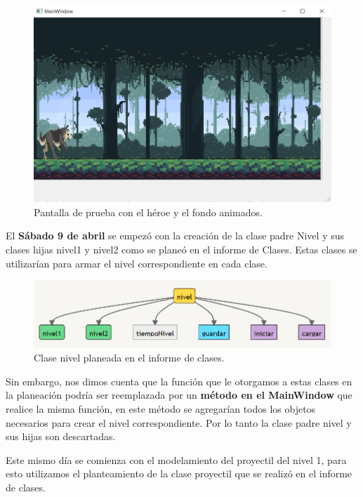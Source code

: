 \documentclass{article}
\begin{document}
\begin{figure}[h]
\includegraphics[scale=0.6]{Images/animaciones.png}
\centering
\caption{Pantalla de prueba con el héroe y el fondo animados.}
\label{fig:animacion}
\end{figure}

El \textbf{Sábado 9 de abril} se empezó con la creación de la clase padre Nivel y sus clases hijas nivel1 y nivel2 como se planeó en el informe de Clases. Estas clases se utilizarían para armar el nivel correspondiente en cada clase.

\newpage
\begin{figure}[h]
\includegraphics[scale=0.6]{Images/niveles.png}
\centering
\caption{Clase nivel planeada en el informe de clases.}
\label{fig:niveles}
\end{figure}

Sin embargo, nos dimos cuenta que la función que le otorgamos a estas clases en la planeación podría ser reemplazada por un \textbf{método en el MainWindow} que realice la misma función, en este método se agregarían todos los objetos necesarios para crear el nivel correspondiente. Por lo tanto la clase padre nivel y sus hijas son descartadas.

Este mismo día se comienza con el modelamiento del proyectil del nivel 1, para esto utilizamos el planteamiento de la clase proyectil que se realizó en el informe de clases.
\end{document}
